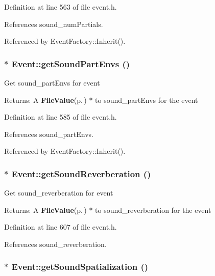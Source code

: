 Definition at line 563 of file event.h.

References sound\_\-num\-Partials.

Referenced by Event\-Factory::Inherit().
\subsubsection{$\ast$ Event::get\-Sound\-Part\-Envs ()\hspace{0.3cm}{\tt  [inline]}}\label{classEvent_a68}


Get sound\_\-part\-Envs for event \begin{Desc}
\item[Returns:]A {\bf File\-Value}{\rm (p.\,\pageref{classFileValue})} $\ast$ to sound\_\-part\-Envs for the event \end{Desc}


Definition at line 585 of file event.h.

References sound\_\-part\-Envs.

Referenced by Event\-Factory::Inherit().
\subsubsection{$\ast$ Event::get\-Sound\-Reverberation ()\hspace{0.3cm}{\tt  [inline]}}\label{classEvent_a72}


Get sound\_\-reverberation for event \begin{Desc}
\item[Returns:]A {\bf File\-Value}{\rm (p.\,\pageref{classFileValue})} $\ast$ to sound\_\-reverberation for the event \end{Desc}


Definition at line 607 of file event.h.

References sound\_\-reverberation.
\subsubsection{$\ast$ Event::get\-Sound\-Spatialization ()\hspace{0.3cm}{\tt  [inline]}}\label{classEvent_a74}



